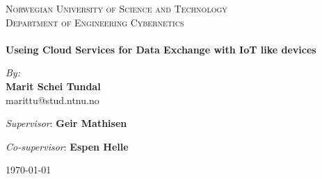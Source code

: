
\begin{center}

\textsc{\LARGE Norwegian University of Science and Technology}\\[0.8cm] 
\textsc{\Large Department of Engineering Cybernetics}\\[0.6cm]

\HRule \\[0.4cm]
{ \huge \bfseries Useing Cloud Services for Data Exchange with IoT like devices}
\HRule \\[1.5cm]

\begin{center} \large
\emph{By:}\\
\textbf{Marit Schei Tundal}\\
marittu@stud.ntnu.no
\end{center}

\begin{center}\large
\emph{Supervisor}: \textbf{Geir Mathisen}
\end{center}
\begin{center}\large
\emph{Co-supervisor}: \textbf{Espen Helle}
\end{center}

\vfill

\begin{figure}[!h]
    \centering
\end{figure}

\vfill

{\large \monthyear\today}

\end{center}
\newpage